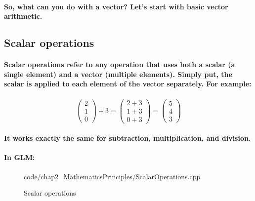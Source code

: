 \paragraph{
    So, what can you do with a vector? Let's start with basic vector arithmetic.
}

\subsection{Scalar operations}
\paragraph{
    Scalar operations refer to any operation that uses both a scalar (a single element) and a vector (multiple elements). Simply put, the scalar is applied to each element of the vector separately. For example:
}

\paragraph{
    \begin{equation*}
    \begin{pmatrix}
    2\\
    1\\
    0
    \end{pmatrix} +3=\begin{pmatrix}
    2+3\\
    1+3\\
    0+3
    \end{pmatrix} =\begin{pmatrix}
    5\\
    4\\
    3
    \end{pmatrix}
    \end{equation*}
}

\paragraph{
    It works exactly the same for subtraction, multiplication, and division.
}

\paragraph{
    In GLM:
}

\begin{frame}{}
    \begin{figure}[ht]
    \centering
    \colorbox{backgroundcolor}{
        \parbox{0.9\textwidth}{
            
            {code/chap2_MathematicsPrinciples/ScalarOperations.cpp}
        }
    }
    \caption{Scalar operations}
    \label{fig:scalar_operations}
    \end{figure}
\end{frame}

